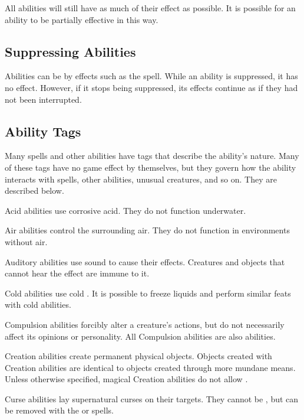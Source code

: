         All abilities will still have as much of their effect as possible.
        It is possible for an ability to be partially effective in this way.

    \subsection{Suppressing Abilities}\label{Suppressing Abilities}
        Abilities can be  by effects such as the  spell.
        While an ability is suppressed, it has no effect.
        However, if it stops being suppressed, its effects continue as if they had not been interrupted.

    \subsection{Ability Tags}\label{Ability Tags}

        Many spells and other abilities have tags that describe the ability's nature.
        Many of these tags have no game effect by themselves, but they govern how the ability interacts with spells, other abilities, unusual creatures, and so on.
        They are described below.

         Acid abilities use corrosive acid.
        They do not function underwater.

         Air abilities control the surrounding air.
        They do not function in environments without air.

         Auditory abilities use sound to cause their effects.
        Creatures and objects that cannot hear the effect are immune to it.

         Cold abilities use cold . It is possible to freeze liquids and perform similar feats with cold abilities.

         Compulsion abilities forcibly alter a creature's actions, but do not necessarily affect its opinions or personality.
        All Compulsion abilities are also  abilities.

         Creation abilities create permanent physical objects.
        Objects created with Creation abilities are identical to objects created through more mundane means.
        Unless otherwise specified, magical Creation abilities do not allow .

         Curse abilities lay supernatural curses on their targets.
        They cannot be , but can be removed with the  or  spells.

